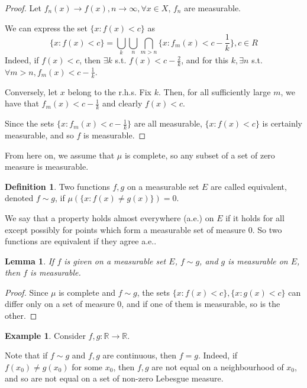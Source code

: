 \documentclass[11pt,a4paper]{report}
\newtheorem{lemma}[theorem]{Lemma}
\theoremstyle{plain}
\theoremstyle{definition}
\newtheorem*{defn}{Definition}
\newtheorem*{eg}{Example}
\theoremstyle{remark}
\newcommand{\Union}{\bigcup}
\newcommand{\Intersection}{\bigcap}
\newcommand{\R}{\mathbb{R}}
\begin{document}
\begin{proof}
  Let $f_n(x) \rightarrow f(x), n \rightarrow \infty, \forall x \in X$, $f_n$ are measurable.

  We can express the set $\{ x : f(x) < c \}$ as $$\{ x : f(x) < c \} = \Union_{k} \Union_{n} \Intersection_{m > n} \{ x : f_m(x) < c - \frac{1}{k} \}, c \in R$$
  Indeed, if $f(x) < c$, then $\exists k$ s.t. $f(x) < c - \frac{2}{k}$, and for this $k, \exists n$ s.t. $\forall m > n, f_m(x) < c - \frac{1}{k}$.

    Conversely, let $x$ belong to the r.h.s. Fix $k$. Then, for all sufficiently large $m$, we have that $f_m(x) < c - \frac{1}{k}$ and clearly $f(x) < c$.

    Since the sets $\{ x : f_m(x) < c - \frac{1}{k} \}$ are all measurable, $\{ x : f(x) < c \}$ is certainly measurable, and so $f$ is measurable.
\end{proof}


From here on, we assume that $\mu$ is complete, so any subset of a set of zero measure is measurable.

\begin{defn}
 Two functions $f, g$ on a measurable set $E$ are called equivalent, denoted $f \sim g$, if $\mu(\{ x : f(x) \ne g(x)\}) = 0$.

  We say that a property holds almost everywhere (a.e.) on $E$ if it holds for all except possibly for points which form a measurable set of measure 0. So two functions are equivalent if they agree a.e.. 
\end{defn}

\begin{lemma}
  If $f$ is given on a measurable set $E$, $f \sim g$, and $g$ is measurable on $E$, then $f$ is measurable.
\end{lemma}

\begin{proof}
  Since $\mu$ is complete and $f \sim g$, the sets $\{ x : f(x) < c \}, \{ x : g(x) < c \}$ can differ only on a set of measure 0, and if one of them is measurable, so is the other.
\end{proof}

\begin{eg}
  Consider $f, g : \R \rightarrow \R$.

  Note that if $f \sim g$ and $f, g$ are continuous, then $f = g$. Indeed, if $f(x_0) \ne g(x_0)$ for some $x_0$, then $f, g$ are not equal on a neighbourhood of $x_0$, and so are not equal on a set of non-zero Lebesgue measure.
\end{eg}
\end{document}
